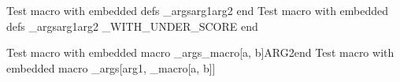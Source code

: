 \documentclass{article}
\author{Macro Arg Embedded Test}
\begin{document}
	Test macro with embedded defs \pym\emb_args{\SIMPLEDEF arg1}{arg2} end
	Test macro with embedded defs \pym\emb_args{arg1}{arg2 \DEF_WITH_UNDER_SCORE} end

	Test macro with embedded macro \pym\emb_args{\pym\inside_macro[a, b]}{ARG2}end
	Test macro with embedded macro \pym\emb_args[arg1, {\pym\inside_macro[a, b]}]\test
\end{document}
